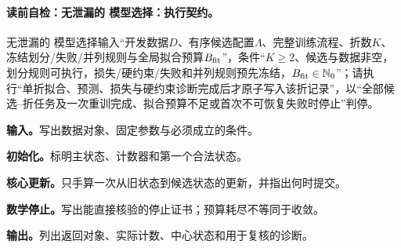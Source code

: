\label{struct:V1-C10-CH19}
\label{struct:V1-C10-CH20}
\label{struct:V1-C10-CH21}
\paragraph{读前自检：无泄漏的 模型选择：执行契约。}无泄漏的 模型选择输入“开发数据$D$、有序候选配置$\Lambda$、完整训练流程、折数$K$、冻结划分/失败/并列规则与全局拟合预算$B_{\rm fit}$”，条件“$K\ge2$、候选与数据非空，划分规则可执行，损失/硬约束/失败和并列规则预先冻结，$B_{\rm fit}\in\mathbb N_0$”；请执行“单折拟合、预测、损失与硬约束诊断完成后才原子写入该折记录”，以“全部候选--折任务及一次重训完成、拟合预算不足或首次不可恢复失败时停止”判停。\par
\begin{keypointbox}[title={无泄漏的 模型选择：五步阅读}]
\textbf{输入。}写出数据对象、固定参数与必须成立的条件。\par
\textbf{初始化。}标明主状态、计数器和第一个合法状态。\par
\textbf{核心更新。}只手算一次从旧状态到候选状态的更新，并指出何时提交。\par
\textbf{数学停止。}写出能直接核验的停止证书；预算耗尽不等同于收敛。\par
\textbf{输出。}列出返回对象、实际计数、中心状态和用于复核的诊断。
\end{keypointbox}

